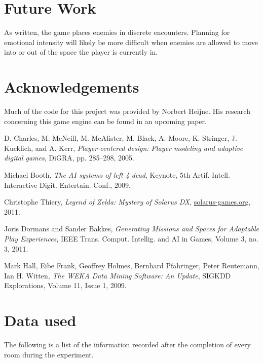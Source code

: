 \documentclass[a4paper]{article}
\begin{document}
\begin{multicols*}{2}
\section{Future Work}
As written, the game places enemies in discrete encounters. Planning for emotional intensity will likely be more difficult when enemies are allowed to move into or out of the space the player is currently in. 

\section{Acknowledgements}
Much of the code for this project was provided by Norbert Heijne. His research concerning this game engine can be found in an upcoming paper.


\begin{thebibliography}{9}

D. Charles, M. McNeill, M. McAlister, M. Black, A. Moore, K. Stringer, J. Kucklich, and A. Kerr, 
\emph{Player-centered design: Player modeling and
adaptive digital games},
DiGRA, pp. 285–298,
2005.

Michael Booth,
\emph{The AI systems of left 4 dead},
Keynote, 5th Artif. Intell. Interactive Digit. Entertain. Conf.,
2009.

Christophe Thiery,
\emph{Legend of Zelda: Mystery of Solarus DX},
\url{solarus-games.org},
2011.

Joris Dormans and Sander Bakkes,
\emph{Generating Missions and Spaces for
Adaptable Play Experiences},
{IEEE} Trans. Comput. Intellig. and {AI} in Games, Volume 3, no. 3,
2011.

Mark Hall, Eibe Frank, Geoffrey Holmes, Bernhard Pfahringer, Peter Reutemann, Ian H. Witten,
\emph{The WEKA Data Mining Software: An Update},
SIGKDD Explorations, Volume 11, Issue 1,
2009.

\end{thebibliography}
\end{multicols*}

\clearpage
\appendix
\section{Data used}
The following is a list of the information recorded after the completion of every room during the experiment.
\end{document}
